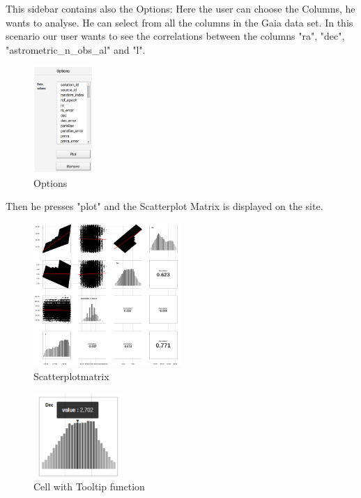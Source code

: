 \documentclass{vgtc}                          %
\begin{document}
 This sidebar contains also the Options: Here the user can choose the Columns, he wants to analyse. He can select from all the columns in the Gaia data set. In this scenario our user wants to see the correlations between the columns "ra", "dec", "astrometric\_n\_obs\_al" and "l".
 
\begin{figure}[H]
\includegraphics[width=0.2\textwidth]{options.png}
\centering
\caption{Options}
\end{figure} 
 
Then he presses "plot" and the Scatterplot Matrix is displayed on the site.

\begin{figure}[H]
\includegraphics[width=0.5\textwidth]{scattermatrix.png}
\centering
\caption{Scatterplotmatrix}
\end{figure}

\begin{figure}[H]
\includegraphics[width=0.3\textwidth]{tooltip.png}
\centering
\caption{Cell with Tooltip function}
\end{figure}
\end{document}
